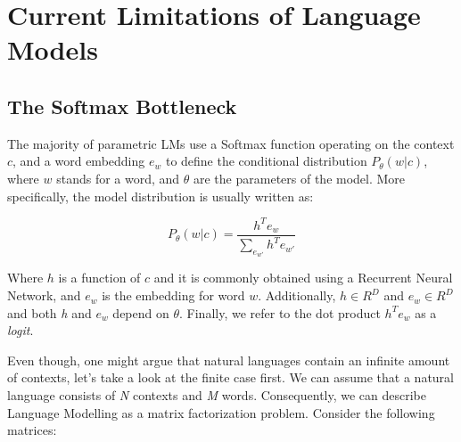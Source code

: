 \chapter{Current Limitations of Language Models}
\label{chapter:limitations}

\section{The Softmax Bottleneck}
\label{section:limitations:softmax_bottleneck}

The majority of parametric LMs use a Softmax function operating on the context $ c $, and a word embedding $ e_w $ to define the conditional distribution $ P_\theta(w|c) $, where $ w $ stands for a word, and $ \theta $ are the parameters of the model. More specifically, the model distribution is usually written as:

\begin{displaymath}
    P_\theta(w | c) = \frac{h^Te_w}{\sum_{e_{w'}} h^Te_{w'}}
\end{displaymath}


Where $ h $ is a function of $ c $ and it is commonly obtained using a Recurrent Neural Network, and $ e_w $ is the embedding for word $ w $. Additionally, $ h \in R^D $ and $ e_w \in R^D $ and both \emph{h} and $ e_w $ depend on $ \theta $. Finally, we refer to the dot product $ h^Te_w $ as a \emph{logit}.

Even though, one might argue that natural languages contain an infinite amount of contexts, let's take a look at the finite case first. We can assume that a natural language consists of \emph{N} contexts and \emph{M} words. Consequently, we can describe Language Modelling as a matrix factorization problem. Consider the following matrices:


